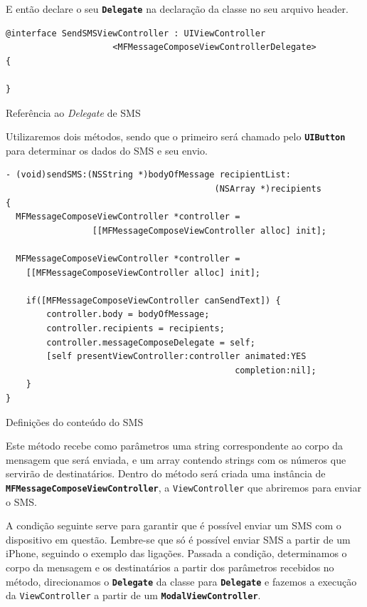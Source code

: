 \documentclass[a4paper,12pt,brazil,doubleside]{book}
\begin{document}
\begin{singlespace}
E então declare o seu \texttt{\textbf{Delegate}} na declaração da classe no seu arquivo header.

\begin{listing}[H]
\begin{verbatim}
@interface SendSMSViewController : UIViewController
                     <MFMessageComposeViewControllerDelegate>
{
	
}
\end{verbatim}
\caption{Referência ao \emph{Delegate} de SMS}
\end{listing}


Utilizaremos dois métodos, sendo que o primeiro será chamado pelo \texttt{\textbf{UIButton}} para determinar os dados do SMS e seu envio.

\begin{listing}[H]
\begin{verbatim}
- (void)sendSMS:(NSString *)bodyOfMessage recipientList:
                                         (NSArray *)recipients
{
  MFMessageComposeViewController *controller =
                 [[MFMessageComposeViewController alloc] init];

  MFMessageComposeViewController *controller =
    [[MFMessageComposeViewController alloc] init];
    
    if([MFMessageComposeViewController canSendText]) {
        controller.body = bodyOfMessage;
        controller.recipients = recipients;
        controller.messageComposeDelegate = self;
        [self presentViewController:controller animated:YES
                                             completion:nil];
    }
}
\end{verbatim}
\caption{Definições do conteúdo do SMS}
\end{listing}


Este método recebe como parâmetros uma string correspondente ao corpo da mensagem que será enviada, e um array contendo strings com os números que servirão de destinatários. Dentro do método será criada uma instância de \texttt{\textbf{MFMessageComposeViewController}}, a \texttt{ViewController} que abriremos para enviar o SMS.

A condição seguinte serve para garantir que é possível enviar um SMS com o dispositivo em questão. Lembre-se que só é possível enviar SMS a partir de um iPhone, seguindo o exemplo das ligações. Passada a condição, determinamos o corpo da mensagem e os destinatários a partir dos parâmetros recebidos no método, direcionamos o \texttt{\textbf{Delegate}} da classe para \texttt{\textbf{Delegate}} e fazemos a execução da \texttt{ViewController} a partir de um \texttt{\textbf{ModalViewController}}.


\end{singlespace}
\end{document}
